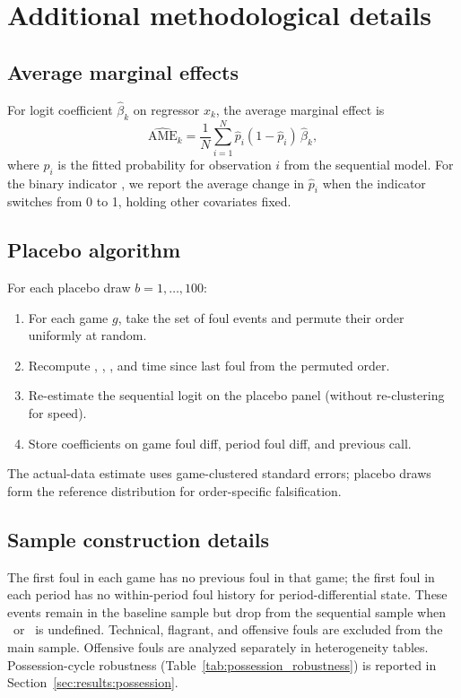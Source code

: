 \label{app:methods}
\section{Additional methodological details}
\label{app:methods:detail}

\subsection{Average marginal effects}

For logit coefficient $\hat{\beta}_k$ on regressor $x_k$, the average marginal effect is
\begin{equation}
  \widehat{\mathrm{AME}}_k = \frac{1}{N}\sum_{i=1}^{N} \hat{p}_i (1-\hat{p}_i)\, \hat{\beta}_k,
\end{equation}
where $\hat{p}_i$ is the fitted probability for observation $i$ from the sequential model. For the binary indicator \foullast, we report the average change in $\hat{p}_i$ when the indicator switches from 0 to 1, holding other covariates fixed.

\subsection{Placebo algorithm}

For each placebo draw $b=1,\ldots,100$:
\begin{enumerate}
  \item For each game $g$, take the set of foul events and permute their order uniformly at random.
  \item Recompute \fouldiff, \perioddiff, \foullast, and time since last foul from the permuted order.
  \item Re-estimate the sequential logit on the placebo panel (without re-clustering for speed).
  \item Store coefficients on game foul diff, period foul diff, and previous call.
\end{enumerate}
The actual-data estimate uses game-clustered standard errors; placebo draws form the reference distribution for order-specific falsification.

\subsection{Sample construction details}

The first foul in each game has no previous foul in that game; the first foul in each period has no within-period foul history for period-differential state. These events remain in the baseline sample but drop from the sequential sample when \foullast\ or \perioddiff\ is undefined. Technical, flagrant, and offensive fouls are excluded from the main sample. Offensive fouls are analyzed separately in heterogeneity tables. Possession-cycle robustness (Table~\ref{tab:possession_robustness}) is reported in Section~\ref{sec:results:possession}.




